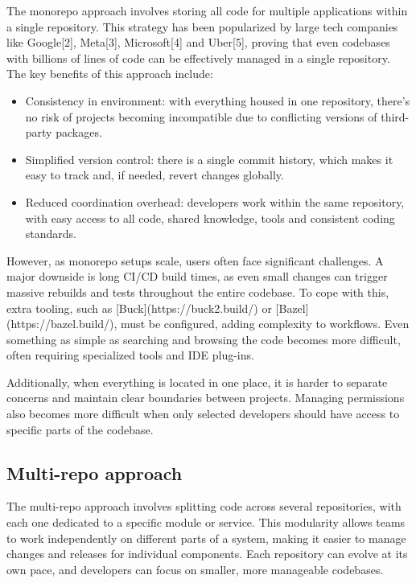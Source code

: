\documentclass{article}
\begin{document}
  The monorepo approach involves storing all code for multiple applications within
  a single repository. This strategy has been popularized by large tech companies
  like Google[2], Meta[3], Microsoft[4] and Uber[5], proving that even codebases
  with billions of lines of code can be effectively managed in a single
  repository. The key benefits of this approach include:

  \begin{itemize}
    \item Consistency in environment: with everything housed in one repository, there's
    no risk of projects becoming incompatible due to conflicting versions of
    third-party packages.
    \item Simplified version control: there is a single commit history, which makes it
    easy to track and, if needed, revert changes globally.
  \item Reduced coordination overhead: developers work within the same repository,
    with easy access to all code, shared knowledge, tools and consistent coding
    standards.
  \end{itemize}

  However, as monorepo setups scale, users often face significant challenges. A
  major downside is long CI/CD build times, as even small changes can trigger
  massive rebuilds and tests throughout the entire codebase. To cope with this,
  extra tooling, such as [Buck](https://buck2.build/) or
  [Bazel](https://bazel.build/), must be configured, adding complexity to
  workflows. Even something as simple as searching and browsing the code becomes
  more difficult, often requiring specialized tools and IDE plug-ins.

  Additionally, when everything is located in one place, it is harder to separate
  concerns and maintain clear boundaries between projects. Managing permissions
  also becomes more difficult when only selected developers should have access to
  specific parts of the codebase.

\subsection{Multi-repo approach}

The multi-repo approach involves splitting code across several repositories,
with each one dedicated to a specific module or service. This modularity allows
teams to work independently on different parts of a system, making it easier to
manage changes and releases for individual components. Each repository can
evolve at its own pace, and developers can focus on smaller, more manageable
codebases.
\end{document}
